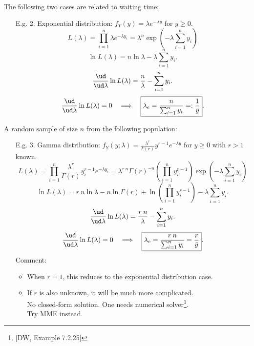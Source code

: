\begin{frame}

The following two cases are related to waiting time: \\[1em]

 \begin{enumerate}
 \item[E.g. 2.] Exponential distribution: $f_Y(y)=\lambda e^{-\lambda y}$ for $y\ge 0$.
 \[
 L(\lambda) = \prod_{i=1}^n
\lambda e^{-\lambda y_i} = \lambda^{n} \exp\left(-\lambda\sum_{i=1}^n y_i\right)
 \]\pause
 \[
 \ln L(\lambda) = n\ln\lambda - \lambda\sum_{i=1}^n y_i.
 \]\pause
 \[
 \frac{\ud }{\ud \lambda} \ln L(\lambda) =   \frac{n}{\lambda} - \sum_{i=1}^n y_i.
 \]\pause
 \[
 \frac{\ud }{\ud \lambda} \ln L(\lambda) =0 \quad\Longrightarrow\quad
 \boxed{\lambda_e = \frac{n}{\sum_{i=1}^n y_i} =: \frac{1}{\bar{y} }}.
 \]
\end{enumerate}

\end{frame}
\begin{frame}
A random sample of size $n$ from the following population: \\[1em]
 \begin{enumerate}
 \item[E.g. 3.] Gamma distribution: $f_Y(y;\lambda)= \frac{\lambda^r}{\Gamma(r)} y^{r-1} e^{-\lambda y}$ for $y\ge 0$ with $r>1$ known.
 \[
 L(\lambda) = \prod_{i=1}^n
\frac{\lambda^r}{\Gamma(r)} y_i^{r-1} e^{-\lambda y_i} = \lambda^{r \: n} \Gamma(r)^{{-n}} \left(\prod_{i=1}^n y_i^{r-1}\right)\exp\left(-\lambda\sum_{i=1}^n y_i\right)
 \]\pause
 \[
 \ln L(\lambda) = r\: n\ln\lambda -n\ln\Gamma(r)+ \ln\left(\prod_{i=1}^{n}y_i^{r-1}\right)-\lambda\sum_{i=1}^n y_i.
 \]\pause
 \[
 \frac{\ud }{\ud \lambda} \ln L(\lambda) =   \frac{r\: n}{\lambda} -\sum_{i=1}^n y_i.
 \]\pause
 \[
 \frac{\ud }{\ud \lambda} \ln L(\lambda) =0 \quad\Longrightarrow\quad
 \boxed{\lambda_e = \frac{r\: n}{\sum_{i=1}^n y_i} = \frac{r}{\bar{y} }}.
 \]
 \vfill
 Comment:
 \begin{itemize}
  \item When $r=1$, this reduces to the exponential distribution case.
  \item If $r$ is also unknown, it will be much more complicated.\\
  No closed-form solution. One needs numerical solver\footnote{[DW, Example 7.2.25]}.\\
  Try MME instead.
 \end{itemize}
\end{enumerate}
\end{frame}
